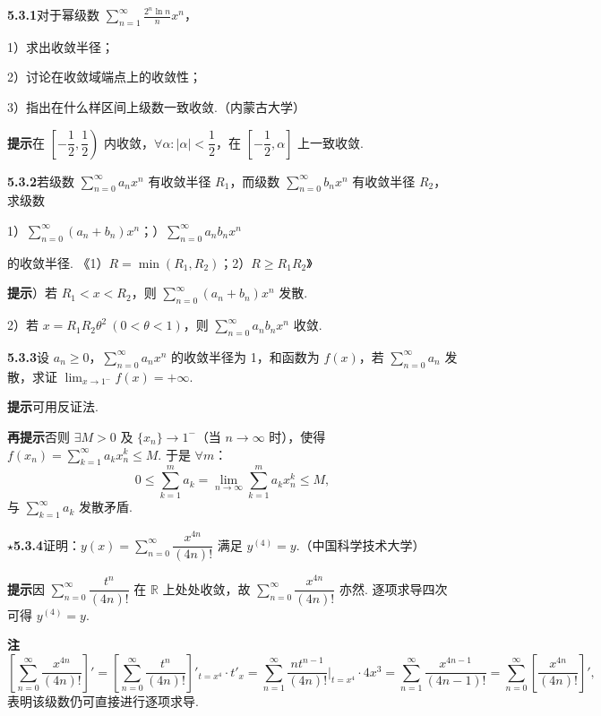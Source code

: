 \documentclass[UTF8, 12pt, fontset=fandol, oneside]{ctexart}
\begin{document}
\noindent\textbf{5.3.1}\quad 对于幂级数 $\displaystyle\sum_{n=1}^{\infty}\frac{2^n\ln n}{n}x^n$，

1）求出收敛半径；

2）讨论在收敛域端点上的收敛性；

3）指出在什么样区间上级数一致收敛.（内蒙古大学）

\noindent\textbf{提示}\quad 在 $\left[-\dfrac12,\dfrac12\right)$ 内收敛，$\forall\alpha:|\alpha|<\dfrac12$，在 $\left[-\dfrac12,\alpha\right]$ 上一致收敛.

\noindent\textbf{5.3.2}\quad 若级数 $\displaystyle\sum_{n=0}^{\infty}a_nx^n$ 有收敛半径 $R_1$，而级数 $\displaystyle\sum_{n=0}^{\infty}b_nx^n$ 有收敛半径 $R_2$，求级数

1）$\displaystyle\sum_{n=0}^{\infty}(a_n+b_n)x^n$；）$\displaystyle\sum_{n=0}^{\infty}a_nb_nx^n$

的收敛半径. \hfill 《1）$R=\min(R_1,R_2)$；2）$R\ge R_1R_2$》

\noindent\textbf{提示}）若 $R_1<x<R_2$，则 $\displaystyle\sum_{n=0}^{\infty}(a_n+b_n)x^n$ 发散.

2）若 $x=R_1R_2\theta^2\ (0<\theta<1)$，则 $\displaystyle\sum_{n=0}^{\infty}a_nb_nx^n$ 收敛.

\noindent\textbf{5.3.3}\quad 设 $a_n\ge0$，$\displaystyle\sum_{n=0}^{\infty}a_nx^n$ 的收敛半径为 1，和函数为 $f(x)$，若 $\displaystyle\sum_{n=0}^{\infty}a_n$ 发散，求证 $\displaystyle\lim_{x\to1^-}f(x)=+\infty$.

\noindent\textbf{提示}\quad 可用反证法.

\noindent\textbf{再提示}\quad 否则 $\exists M>0$ 及 $\{x_n\}\to1^-$（当 $n\to\infty$ 时），使得 $f(x_n)=\displaystyle\sum_{k=1}^{\infty}a_kx_n^k\le M$. 于是 $\forall m$：
\[
  0\le\sum_{k=1}^m a_k=\lim_{n\to\infty}\sum_{k=1}^m a_kx_n^k\le M,
\]
与 $\displaystyle\sum_{k=1}^{\infty}a_k$ 发散矛盾.

\noindent\textbf{\(\star\)5.3.4}\quad 证明：$y(x)=\displaystyle\sum_{n=0}^{\infty}\dfrac{x^{4n}}{(4n)!}$ 满足 $y^{(4)}=y$.（中国科学技术大学）

\noindent\textbf{提示}\quad 因 $\displaystyle\sum_{n=0}^{\infty}\dfrac{t^n}{(4n)!}$ 在 $\mathbb R$ 上处处收敛，故 $\displaystyle\sum_{n=0}^{\infty}\dfrac{x^{4n}}{(4n)!}$ 亦然. 逐项求导四次可得 $y^{(4)}=y$.

\noindent\textbf{注}\quad
\[
  \left[\sum_{n=0}^{\infty}\frac{x^{4n}}{(4n)!}\right]'
  =\left[\sum_{n=0}^{\infty}\frac{t^n}{(4n)!}\right]'_{t=x^4}\cdot t'_x
  =\sum_{n=1}^{\infty}\frac{nt^{n-1}}{(4n)!}\bigg|_{t=x^4}\cdot4x^3
  =\sum_{n=1}^{\infty}\frac{x^{4n-1}}{(4n-1)!}
  =\sum_{n=0}^{\infty}\left[\frac{x^{4n}}{(4n)!}\right]',
\]
表明该级数仍可直接进行逐项求导.
\end{document}
